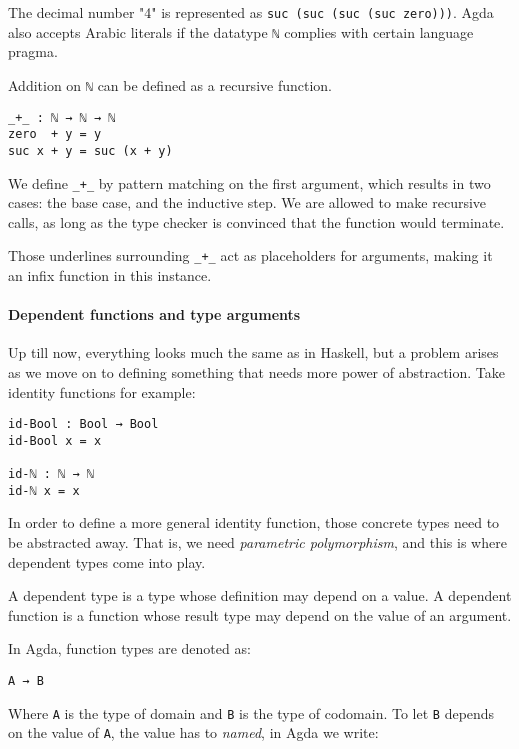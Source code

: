 \documentclass[../thesis.tex]{subfiles}
\begin{document}
The decimal number "4" is represented as {\lstinline|suc (suc (suc (suc zero)))|}.
Agda also accepts Arabic literals if the datatype {\lstinline|ℕ|} complies with
certain language pragma.

Addition on {\lstinline|ℕ|} can be defined as a recursive function.

\begin{lstlisting}
_+_ : ℕ → ℕ → ℕ
zero  + y = y
suc x + y = suc (x + y)
\end{lstlisting}

We define {\lstinline|_+_|} by pattern matching on the first argument, which results
in two cases: the base case, and the inductive step. We are allowed to make
recursive calls, as long as the type checker is convinced that the function
would terminate.

Those underlines surrounding {\lstinline|_+_|} act as placeholders for arguments, making
it an infix function in this instance.

\paragraph{Dependent functions and type arguments}

Up till now, everything looks much the same as in Haskell, but a problem arises as
we move on to defining something that needs more power of abstraction. Take identity
functions for example:

\begin{lstlisting}
id-Bool : Bool → Bool
id-Bool x = x

id-ℕ : ℕ → ℕ
id-ℕ x = x
\end{lstlisting}

In order to define a more general identity function, those concrete types need
to be abstracted away. That is, we need \textit{parametric polymorphism}, and this is
where dependent types come into play.

A dependent type is a type whose definition may depend on a value. A dependent
function is a function whose result type may depend on the value of an argument.

In Agda, function types are denoted as:

\begin{lstlisting}
A → B
\end{lstlisting}

Where {\lstinline|A|} is the type of domain and {\lstinline|B|} is the type of
codomain. To let {\lstinline|B|} depends on the value of {\lstinline|A|}, the
value has to \textit{named}, in Agda we write:
\end{document}

